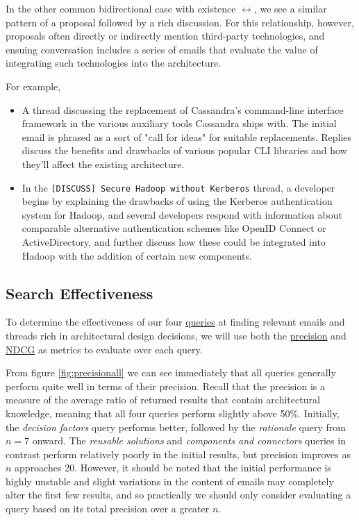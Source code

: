 \documentclass[a4paper, 12pt]{article}
\begin{document}
		In the other common bidirectional case with existence $ \leftrightarrow $, we see a similar pattern of a proposal followed by a rich discussion. For this relationship, however, proposals often directly or indirectly mention third-party technologies, and ensuing conversation includes a series of emails that evaluate the value of integrating such technologies into the architecture.
		
		For example,
		
		\begin{itemize}
			\item A thread discussing the replacement of Cassandra's command-line interface framework in the various auxiliary tools Cassandra ships with. The initial email is phrased as a sort of "call for ideas" for suitable replacements. Replies discuss the benefits and drawbacks of various popular CLI libraries and how they'll affect the existing architecture.
			\item In the \texttt{[DISCUSS] Secure Hadoop without Kerberos} thread, a developer begins by explaining the drawbacks of using the Kerberos authentication system for Hadoop, and several developers respond with information about comparable alternative authentication schemes like OpenID Connect or ActiveDirectory, and further discuss how these could be integrated into Hadoop with the addition of certain new components.
		\end{itemize}
	
	\subsection{Search Effectiveness}
		To determine the effectiveness of our four \hyperref[sec:queries]{queries} at finding relevant emails and threads rich in architectural design decisions, we will use both the \hyperref[eqn:precision]{precision} and \hyperref[eqn:ndcg]{NDCG} as metrics to evaluate over each query.
		
		From figure \ref{fig:precisionall} we can see immediately that all queries generally perform quite well in terms of their precision. Recall that the precision is a measure of the average ratio of returned results that contain architectural knowledge, meaning that all four queries perform slightly above 50\%. Initially, the \textit{decision factors} query performs better, followed by the \textit{rationale} query from $ n = 7 $ onward. The \textit{reusable solutions} and \textit{components and connectors} queries in contrast perform relatively poorly in the initial results, but precision improves as $ n $ approaches 20. However, it should be noted that the initial performance is highly unstable and slight variations in the content of emails may completely alter the first few results, and so practically we should only consider evaluating a query based on its total precision over a greater $ n $.
		
\end{document}
